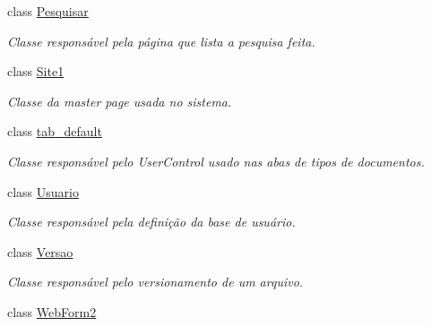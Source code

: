 \begin{DoxyCompactItemize}
class \hyperlink{class_sistema_r_h_1_1_pesquisar}{Pesquisar}
\begin{DoxyCompactList}\small\item\em Classe responsável pela página que lista a pesquisa feita. \item\end{DoxyCompactList}\item 
class \hyperlink{class_sistema_r_h_1_1_site1}{Site1}
\begin{DoxyCompactList}\small\item\em Classe da master page usada no sistema. \item\end{DoxyCompactList}\item 
class \hyperlink{class_sistema_r_h_1_1tab__default}{tab\_\-default}
\begin{DoxyCompactList}\small\item\em Classe responsável pelo UserControl usado nas abas de tipos de documentos. \item\end{DoxyCompactList}\item 
class \hyperlink{class_sistema_r_h_1_1_usuario}{Usuario}
\begin{DoxyCompactList}\small\item\em Classe responsável pela definição da base de usuário. \item\end{DoxyCompactList}\item 
class \hyperlink{class_sistema_r_h_1_1_versao}{Versao}
\begin{DoxyCompactList}\small\item\em Classe responsável pelo versionamento de um arquivo. \item\end{DoxyCompactList}\item 
class \hyperlink{class_sistema_r_h_1_1_web_form2}{WebForm2}
\end{DoxyCompactItemize}
